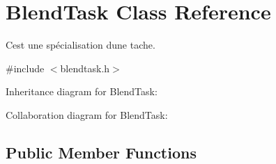\hypertarget{class_blend_task}{}\section{Blend\+Task Class Reference}
\label{class_blend_task}


C\textquotesingle{}est une spécialisation d\textquotesingle{}une tache.  




{\ttfamily \#include $<$blendtask.\+h$>$}



Inheritance diagram for Blend\+Task\+:


Collaboration diagram for Blend\+Task\+:
\subsection*{Public Member Functions}
